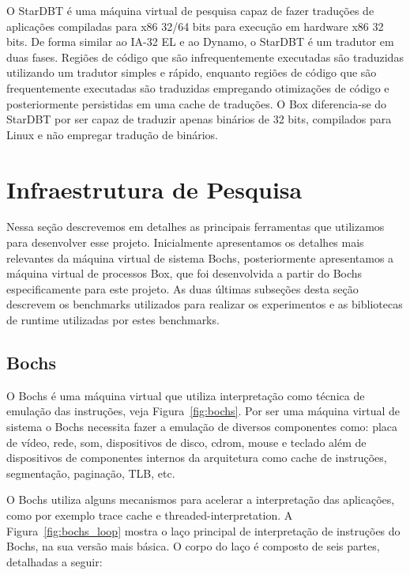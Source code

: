 \documentclass[11pt,twoside]{article}
\begin{document}
O StarDBT \cite{Wang2007} é uma máquina virtual de pesquisa capaz de fazer traduções de 
aplicações compiladas para x86 32/64 bits para execução em hardware x86 32 bits. De 
forma similar ao IA-32 EL e ao Dynamo, o StarDBT é um tradutor em duas fases. Regiões 
de código que são infrequentemente executadas são traduzidas utilizando um tradutor 
simples e rápido, enquanto regiões de código que são frequentemente executadas são 
traduzidas empregando otimizações de código e posteriormente persistidas em uma cache 
de traduções. O Box diferencia-se do StarDBT por ser capaz de traduzir apenas binários 
de 32 bits, compilados para Linux e não empregar tradução de binários.



\section{Infraestrutura de Pesquisa} \label{sec:infraestrutura}

Nessa seção descrevemos em detalhes as principais ferramentas que
utilizamos para desenvolver esse projeto. Inicialmente apresentamos
os detalhes mais relevantes da máquina virtual de sistema Bochs, 
posteriormente apresentamos a máquina virtual de processos Box, que
foi desenvolvida a partir do Bochs especificamente para este projeto.
As duas últimas subseções desta seção descrevem os benchmarks 
utilizados para realizar os experimentos e as bibliotecas de runtime
utilizadas por estes benchmarks.

\subsection{Bochs}

O Bochs é uma máquina virtual que utiliza interpretação como
técnica de emulação das instruções, veja Figura~\ref{fig:bochs}. Por ser 
uma máquina virtual de sistema o Bochs necessita fazer a emulação de 
diversos componentes como: placa de vídeo, rede, som, dispositivos de 
disco, cdrom, mouse e teclado além de dispositivos de componentes internos 
da arquitetura como cache de instruções, segmentação, paginação, TLB, etc.

O Bochs utiliza alguns mecanismos para acelerar a interpretação das 
aplicações, como por exemplo trace cache e threaded-interpretation.
A Figura~\ref{fig:bochs_loop} mostra o laço principal de interpretação 
de instruções do Bochs, na sua versão mais básica. O corpo do laço
é composto de seis partes, detalhadas a seguir:
\end{document}
